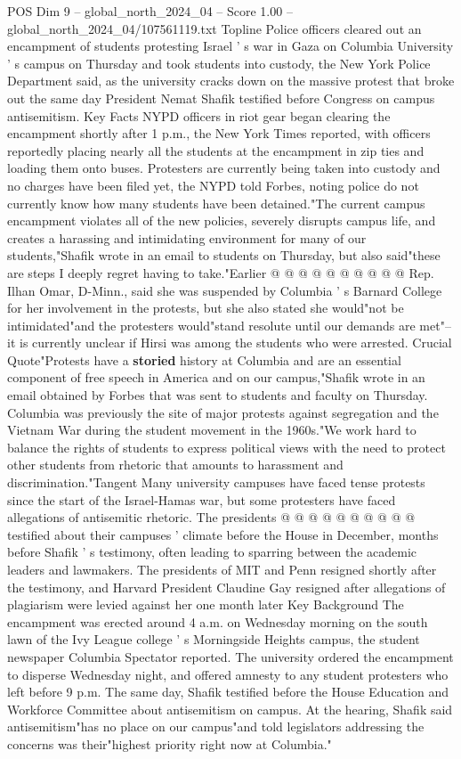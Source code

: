 \begin{textsample}{POS Dim 9 – global\_north\_2024\_04 – Score 1.00 – global\_north\_2024\_04/107561119.txt}  \label{ex:f9_pos_234}
Topline Police officers cleared out an encampment of students protesting Israel ' s war in Gaza on Columbia University ' s campus on Thursday and took students into custody, the New York Police Department said, as the university cracks down on the massive protest that broke out the same day President Nemat Shafik testified before Congress on campus antisemitism.
Key Facts NYPD officers in riot gear began clearing the encampment shortly after 1 p.m., the New York Times reported, with officers reportedly placing nearly all the students at the encampment in zip ties and loading them onto buses.
Protesters are currently being taken into custody and no charges have been filed yet, the NYPD told Forbes, noting police do not currently know how many students have been detained."The current campus encampment violates all of the new policies, severely disrupts campus life, and creates a harassing and intimidating environment for many of our students,"Shafik wrote in an email to students on Thursday, but also said"these are steps I deeply regret having to take."Earlier @ @ @ @ @ @ @ @ @ @ Rep.
Ilhan Omar, D-Minn., said she was suspended by Columbia ' s Barnard College for her involvement in the protests, but she also stated she would"not be intimidated"and the protesters would"stand resolute until our demands are met"-- it is currently unclear if Hirsi was among the students who were arrested.
Crucial Quote"Protests have a \textbf{storied} history at Columbia and are an essential component of free speech in America and on our campus,"Shafik wrote in an email obtained by Forbes that was sent to students and faculty on Thursday.
Columbia was previously the site of major protests against segregation and the Vietnam War during the student movement in the 1960s."We work hard to balance the rights of students to express political views with the need to protect other students from rhetoric that amounts to harassment and discrimination."Tangent Many university campuses have faced tense protests since the start of the Israel-Hamas war, but some protesters have faced allegations of antisemitic rhetoric.
The presidents @ @ @ @ @ @ @ @ @ @ testified about their campuses ' climate before the House in December, months before Shafik ' s testimony, often leading to sparring between the academic leaders and lawmakers.
The presidents of MIT and Penn resigned shortly after the testimony, and Harvard President Claudine Gay resigned after allegations of plagiarism were levied against her one month later Key Background The encampment was erected around 4 a.m. on Wednesday morning on the south lawn of the Ivy League college ' s Morningside Heights campus, the student newspaper Columbia Spectator reported.
The university ordered the encampment to disperse Wednesday night, and offered amnesty to any student protesters who left before 9 p.m.
The same day, Shafik testified before the House Education and Workforce Committee about antisemitism on campus.
At the hearing, Shafik said antisemitism"has no place on our campus"and told legislators addressing the concerns was their"highest priority right now at Columbia."

\end{textsample}

